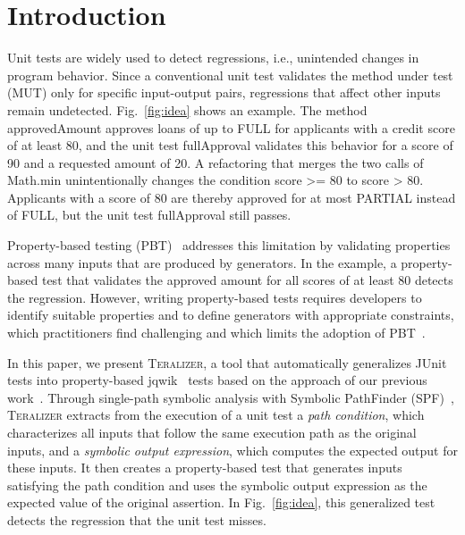 \documentclass[10pt,conference]{IEEEtran}
\newcommand{\Teralizer}{\textsc{Teralizer}}
\newcommand{\codefont}{\fontfamily{lmtt}\selectfont}
\newcommand{\code}[1]{{\codefont #1}}
\begin{document}
\section{Introduction}
\label{sec:introduction}

Unit tests are widely used to detect regressions, i.e., unintended changes in program behavior.
Since a conventional unit test validates the method under test (MUT) only for specific input-output pairs, regressions that affect other inputs remain undetected.
Fig.~\ref{fig:idea} shows an example.
The method \code{approvedAmount} approves loans of up to \code{FULL} for applicants with a credit score of at least 80, and the unit test \code{fullApproval} validates this behavior for a score of 90 and a requested amount of 20.
A refactoring that merges the two calls of \code{Math.min} unintentionally changes the condition \code{score >= 80} to \code{score > 80}.
Applicants with a score of 80 are thereby approved for at most \code{PARTIAL} instead of \code{FULL}, but the unit test \code{fullApproval} still passes.

Property-based testing (PBT)~\cite{claessen_2000_quickcheck} addresses this limitation by validating properties across many inputs that are produced by generators.
In the example, a property-based test that validates the approved amount for all scores of at least 80 detects the regression.
However, writing property-based tests requires developers to identify suitable properties and to define generators with appropriate constraints, which practitioners find challenging and which limits the adoption of PBT~\cite{goldstein_2024_pbt_practice}.

In this paper, we present \Teralizer{}, a tool that automatically generalizes JUnit tests into property-based jqwik~\cite{link_2022_jqwik} tests based on the approach of our previous work~\cite{glock_2025_teralizer}.
Through single-path symbolic analysis with Symbolic PathFinder (SPF)~\cite{pasareanu_2013_symbolic}, \Teralizer{} extracts from the execution of a unit test a \emph{path condition}, which characterizes all inputs that follow the same execution path as the original inputs, and a \emph{symbolic output expression}, which computes the expected output for these inputs.
It then creates a property-based test that generates inputs satisfying the path condition and uses the symbolic output expression as the expected value of the original assertion.
In Fig.~\ref{fig:idea}, this generalized test detects the regression that the unit test misses.
\end{document}
